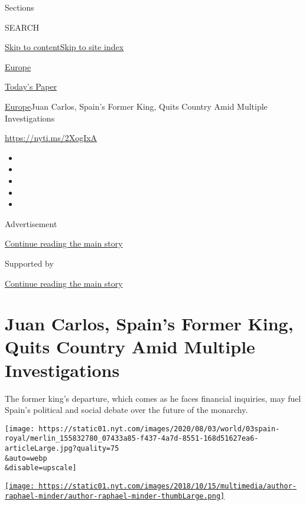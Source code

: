 Sections

SEARCH

\protect\hyperlink{site-content}{Skip to
content}\protect\hyperlink{site-index}{Skip to site index}

\href{https://www.nytimes.com/section/world/europe}{Europe}

\href{https://myaccount.nytimes.com/auth/login?response_type=cookie\&client_id=vi}{}

\href{https://www.nytimes.com/section/todayspaper}{Today's Paper}

\href{/section/world/europe}{Europe}\textbar{}Juan Carlos, Spain's
Former King, Quits Country Amid Multiple Investigations

\url{https://nyti.ms/2XogIxA}

\begin{itemize}
\item
\item
\item
\item
\item
\end{itemize}

Advertisement

\protect\hyperlink{after-top}{Continue reading the main story}

Supported by

\protect\hyperlink{after-sponsor}{Continue reading the main story}

\hypertarget{juan-carlos-spains-former-king-quits-country-amid-multiple-investigations}{%
\section{Juan Carlos, Spain's Former King, Quits Country Amid Multiple
Investigations}\label{juan-carlos-spains-former-king-quits-country-amid-multiple-investigations}}

The former king's departure, which comes as he faces financial
inquiries, may fuel Spain's political and social debate over the future
of the monarchy.

\texttt{[image: https://static01.nyt.com/images/2020/08/03/world/03spain-royal/merlin\_155832780\_07433a85-f437-4a7d-8551-168d51627ea6-articleLarge.jpg?quality=75\\\&auto=webp\\\&disable=upscale]}

\href{https://www.nytimes.com/by/raphael-minder}{\texttt{[image: https://static01.nyt.com/images/2018/10/15/multimedia/author-raphael-minder/author-raphael-minder-thumbLarge.png]}}

